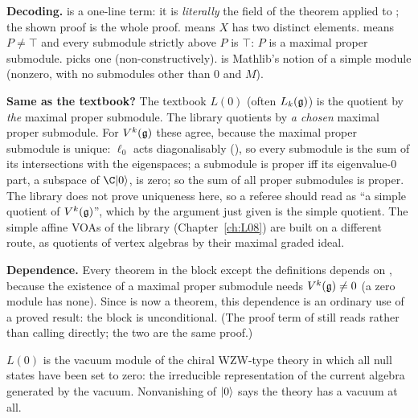 \begin{dictionary}
\textbf{Decoding.} \allowbreak{} is a one-line term: it is \emph{literally} the field
 of the theorem  applied to ; the shown proof is the whole
proof.
 means $X$ has two distinct elements.  means $P\ne\top$ and every
submodule strictly above $P$ is $\top$: $P$ is a maximal proper submodule.  picks one
(non-constructively).  is Mathlib's notion of a simple module (nonzero, with no
submodules other than $0$ and $M$).

\textbf{Same as the textbook?} The textbook $L(0)$ (often $L_k(\mathfrak{g})$) is the quotient by \emph{the}
maximal proper submodule. The library quotients by \emph{a chosen} maximal proper submodule. For
$V^k(\mathfrak{g})$ these agree, because the maximal proper submodule is unique: $\ell_0$ acts diagonalisably
(), so every submodule is the sum of its intersections with the eigenspaces; a
submodule is proper iff its eigenvalue-$0$ part, a subspace of $\C\ltwovac$, is zero; so the sum of all
proper submodules is proper. The library does not prove uniqueness here, so a referee should read
 as ``a simple quotient of $V^k(\mathfrak{g})$'', which by the argument just given is the
simple quotient. The simple affine VOAs of the library (Chapter~\ref{ch:L08}) are built on a different
route, as quotients of vertex algebras by their maximal graded ideal.

\textbf{Dependence.} Every theorem in the block except the definitions depends on ,
because the existence of a maximal proper submodule needs $V^k(\mathfrak{g})\ne0$ (a zero module has none).
Since  is now a theorem, this dependence is an ordinary use of a proved result: the block is
unconditional. (The proof term of \allowbreak{} still reads
 rather than calling
\allowbreak{}\allowbreak{}\allowbreak{}\allowbreak{} directly; the two are the same proof.)
\end{dictionary}

\begin{physics}
$L(0)$ is the vacuum module of the chiral WZW-type theory in which all null states have been set to
zero: the irreducible representation of the current algebra generated by the vacuum. Nonvanishing of
$|0\rangle$ says the theory has a vacuum at all.
\end{physics}

